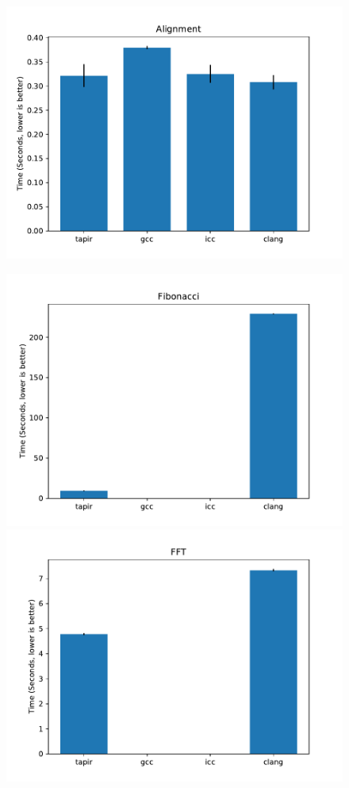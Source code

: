 \documentclass[sigconf]{acmart}
\begin{document}
\begin{figure}
\begin{multicols}{2}
  \includegraphics[width=\linewidth]{alignment.pdf} \par
  \includegraphics[width=\linewidth]{fib.pdf}
  \includegraphics[width=\linewidth]{fft.pdf} \par

\end{multicols}
\end{figure}
\end{document}
